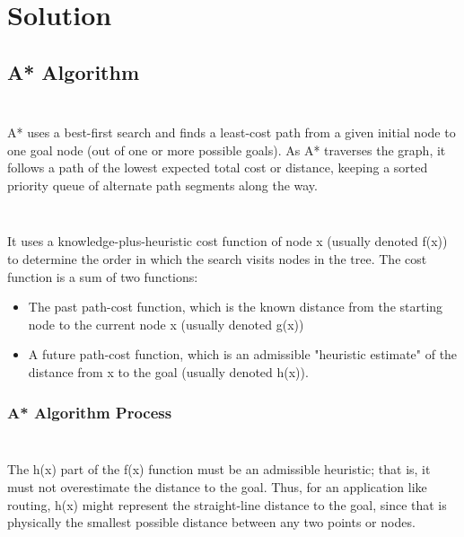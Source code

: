 \chapter{Solution}

\section{A* Algorithm}

\paragraph{} ~\\
A* uses a best-first search and finds a least-cost path from a given initial node to one goal node (out of one or more possible goals). As A* traverses the graph, it follows a path of the lowest expected total cost or distance, keeping a sorted priority queue of alternate path segments along the way.
\paragraph{} ~\\
It uses a knowledge-plus-heuristic cost function of node x (usually denoted f(x)) to determine the order in which the search visits nodes in the tree. The cost function is a sum of two functions:


\begin{itemize}
\item{The past path-cost function, which is the known distance from the starting node to the current node x (usually denoted g(x))}
\item{A future path-cost function, which is an admissible "heuristic estimate" of the distance from x to the goal (usually denoted h(x)).}
\end{itemize}

\subsection{A* Algorithm Process}
\paragraph{} ~\\
The h(x) part of the f(x) function must be an admissible heuristic; that is, it must not overestimate the distance to the goal. Thus, for an application like routing, h(x) might represent the straight-line distance to the goal, since that is physically the smallest possible distance between any two points or nodes. 


